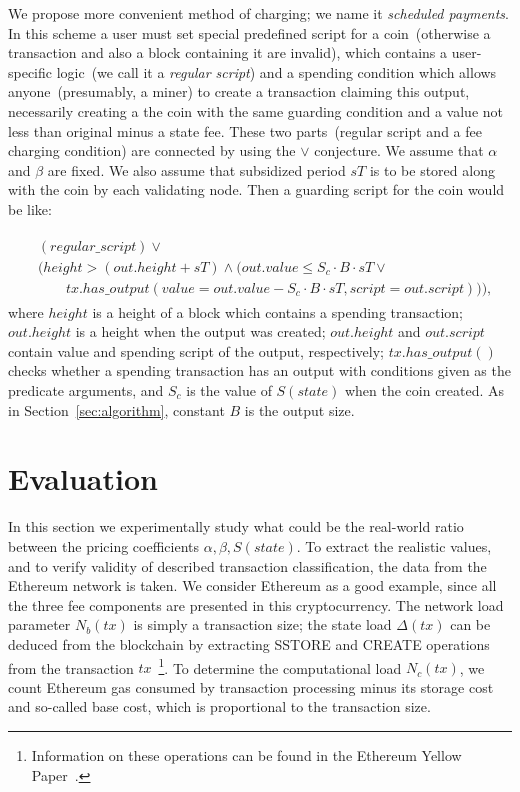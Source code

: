 \documentclass[]{llncs}   %
\begin{document}
We propose more convenient method of charging; we name it {\em scheduled payments}. In this scheme a user must set special predefined script for a coin~(otherwise a transaction and also a block containing it are invalid), which contains a user-specific logic~(we call it a {\em regular script}) and a spending condition which allows anyone~(presumably, a miner) to create a transaction claiming this output, necessarily creating a the coin with the same guarding condition and a value not less than original minus a state fee. These two parts~(regular script and a fee charging condition) are connected by using the $\lor$ conjecture. We assume that $\alpha$ and $\beta$ are fixed. We also assume that subsidized period $sT$ is to be stored along with the coin by each validating node. Then a guarding script for the coin would be like:

\begin{align}
\begin{split}
&(regular\_script) \lor \\
&(height > (out.height + sT) \land (out.value \le S_c \cdot B \cdot sT \lor \\  
&\qquad tx.has\_output(value = out.value - S_c \cdot B \cdot sT, script = out.script))),
\end{split}
\end{align}
where $height$ is a height of a block which contains a spending transaction; $out.height$ is a height when the output was created; $out.height$ and $out.script$ contain value and spending script of the output, respectively; $tx.has\_output()$ checks whether a spending transaction has an output with conditions given as the predicate arguments, and $S_c$ is the value of $S(state)$ when the coin created. As in Section~\ref{sec:algorithm}, constant $B$ is the output size.     


\section{Evaluation}
\label{sec:evaluation}

In this section we experimentally study what could be the real-world
ratio between the pricing coefficients $\alpha, \beta, S(state)$. To extract the realistic 
values, and to verify validity of described transaction classification, the
data from the Ethereum network is taken. We consider Ethereum as a good example,
since all the three fee components are presented in this cryptocurrency. The network load parameter $N_b(tx)$ is simply a transaction size; the state
load $\Delta(tx)$ can be deduced from the blockchain by extracting SSTORE
and CREATE operations from the transaction $tx$~\footnote{Information on these operations can be found in the Ethereum Yellow Paper~\cite{ethyp}.}. To determine the
computational load $N_c(tx)$, we count Ethereum gas consumed by transaction processing minus its storage cost and so-called base cost, which is proportional to the transaction size.
\end{document}
